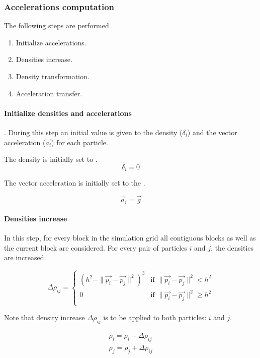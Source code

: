 \subsubsection{Accelerations computation}

The following steps are performed

\begin{enumerate}
\item Initialize accelerations.
\item Densities increase.
\item Density transformation.
\item Acceleration transfer.
\end{enumerate}

\paragraph{Initialize densities and accelerations}.
During this step an initial value is given to the density ($\delta_i$) and the
vector acceleration ($\vec{a_i}$) for each particle.

The density is initially set to .
\[
\delta_i = 0
\]

The vector acceleration is initially set to the .

\[
\vec{a}_i = \vec{g}
\]

\paragraph{Densities increase}
In this step, for every block in the simulation grid all contiguous blocks as
well as the current block are considered. For every pair of particles $i$ and
$j$, the densities are increased.

\[
\Delta \rho_{ij} = 
    \begin{cases}
      (h^2 - \|\vec{p_i} - \vec{p_j}\|^2)^3 & 
          \text{if  } \|\vec{p_i} - \vec{p_j}\|^2 < h^2\\
      0 & 
          \text{if  } \|\vec{p_i} - \vec{p_j}\|^2 \geq h^2\\
    \end{cases}
\]

Note that density increase $\Delta \rho_{ij}$ is to be applied to both particles:
$i$ and $j$.

\[
\begin{split}
\rho_i = \rho_i + \Delta \rho_{ij}\\
\rho_j = \rho_j + \Delta \rho_{ij}\\
\end{split}
\]

